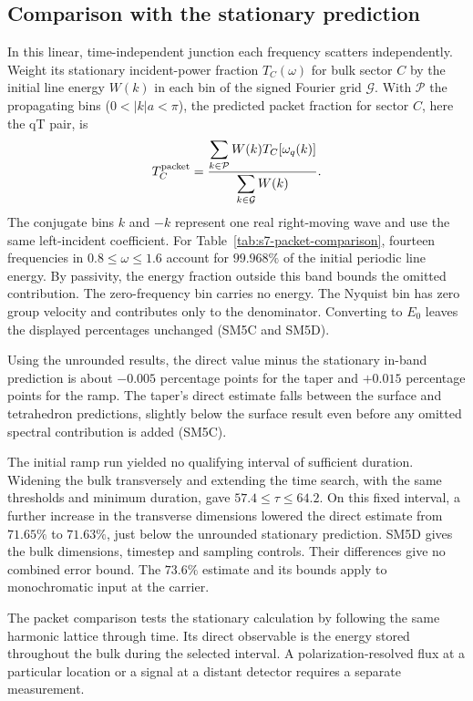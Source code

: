 \documentclass[10pt,aps,onecolumn,floatfix,notitlepage,nofootinbib,showkeys]{revtex4-2}
\begin{document}
\subsection{Comparison with the stationary prediction}
\label{sec:s7-result}

In this linear, time-independent junction each frequency scatters independently. Weight its stationary incident-power fraction $T_C(\omega)$ for bulk sector $C$ by the initial line energy $W(k)$ in each bin of the signed Fourier grid $\mathcal G$. With $\mathcal P$ the propagating bins ($0<|k|a<\pi$), the predicted packet fraction for sector $C$, here the qT pair, is
\begin{equation}
 T_C^{\rm packet}
 =\frac{\displaystyle\sum_{k\in\mathcal P}W(k)T_C[\omega_q(k)]}
 {\displaystyle\sum_{k\in\mathcal G}W(k)}.
 \label{eq:s7-packet-average}
\end{equation}
The conjugate bins $k$ and $-k$ represent one real right-moving wave and use the same left-incident coefficient. For Table~\ref{tab:s7-packet-comparison}, fourteen frequencies in $0.8\le\omega\le1.6$ account for $99.968\%$ of the initial periodic line energy. By passivity, the energy fraction outside this band bounds the omitted contribution. The zero-frequency bin carries no energy. The Nyquist bin has zero group velocity and contributes only to the denominator. Converting to $E_0$ leaves the displayed percentages unchanged (SM5C and SM5D).

Using the unrounded results, the direct value minus the stationary in-band prediction is about $-0.005$ percentage points for the taper and $+0.015$ percentage points for the ramp. The taper's direct estimate falls between the surface and tetrahedron predictions, slightly below the surface result even before any omitted spectral contribution is added (SM5C).

The initial ramp run yielded no qualifying interval of sufficient duration. Widening the bulk transversely and extending the time search, with the same thresholds and minimum duration, gave $57.4\le\tau\le64.2$. On this fixed interval, a further increase in the transverse dimensions lowered the direct estimate from $71.65\%$ to $71.63\%$, just below the unrounded stationary prediction. SM5D gives the bulk dimensions, timestep and sampling controls. Their differences give no combined error bound. The $73.6\%$ estimate and its bounds apply to monochromatic input at the carrier.

The packet comparison tests the stationary calculation by following the same harmonic lattice through time. Its direct observable is the energy stored throughout the bulk during the selected interval. A polarization-resolved flux at a particular location or a signal at a distant detector requires a separate measurement.
\end{document}
